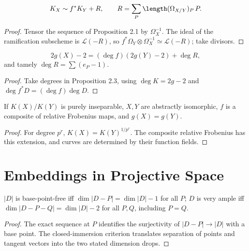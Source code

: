 \begin{proposition}\label{ha-ch4-p23}
\[
K_X\sim f^*K_Y+R,\qquad
R=\sum_P\length(\Omega_{X/Y})_P\,P.
\]
\end{proposition}
\begin{proof}
Tensor the sequence of Proposition 2.1 by \(\Omega_X^{-1}\).  The ideal of
the ramification subscheme is \(\mathcal L(-R)\), so
\(f^*\Omega_Y\otimes\Omega_X^{-1}\simeq\mathcal L(-R)\); take divisors.
\end{proof}

\begin{corollary}[Hurwitz]\label{ha-ch4-c24}
\[
2g(X)-2=(\deg f)(2g(Y)-2)+\deg R,
\]
and tamely \(\deg R=\sum(e_P-1)\).
\end{corollary}
\begin{proof}
Take degrees in Proposition 2.3, using \(\deg K=2g-2\) and
\(\deg f^*D=(\deg f)\deg D\).
\end{proof}

\begin{proposition}\label{ha-ch4-p25}
If \(K(X)/K(Y)\) is purely inseparable, \(X,Y\) are abstractly isomorphic,
\(f\) is a composite of relative Frobenius maps, and \(g(X)=g(Y)\).
\end{proposition}
\begin{proof}
For degree \(p^r\), \(K(X)=K(Y)^{1/p^r}\).  The composite relative Frobenius
has this extension, and curves are determined by their function fields.
\end{proof}

\section{Embeddings in Projective Space}
\label{ha-ch4-s3}
\begin{proposition}\label{ha-ch4-p31}
\(|D|\) is base-point-free iff \(\dim|D-P|=\dim|D|-1\) for all \(P\); \(D\)
is very ample iff \(\dim|D-P-Q|=\dim|D|-2\) for all \(P,Q\), including
\(P=Q\).
\end{proposition}
\begin{proof}
The exact sequence at \(P\) identifies the surjectivity of
\(|D-P|\to|D|\) with a base point.  The closed-immersion criterion translates
separation of points and tangent vectors into the two stated dimension drops.
\end{proof}

